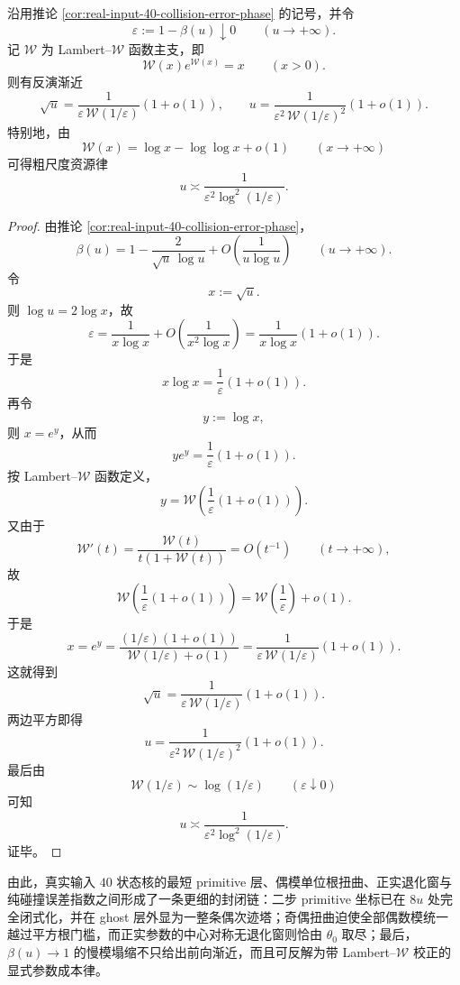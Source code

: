 \begin{theorem}\label{thm:xi-time-part68a-collision-beta-lambertw-inversion}
沿用推论 \ref{cor:real-input-40-collision-error-phase} 的记号，并令
\[
\varepsilon:=1-\beta(u)\downarrow 0
\qquad (u\to+\infty).
\]
记 \(\mathscr W\) 为 Lambert--\(\mathscr W\) 函数主支，即
\[
\mathscr W(x)e^{\mathscr W(x)}=x
\qquad (x>0).
\]
则有反演渐近
\[
\sqrt{u}
=
\frac{1}{\varepsilon\,\mathscr W(1/\varepsilon)}(1+o(1)),
\qquad
u
=
\frac{1}{\varepsilon^2\,\mathscr W(1/\varepsilon)^2}(1+o(1)).
\]
特别地，由
\[
\mathscr W(x)=\log x-\log\log x+o(1)
\qquad (x\to+\infty)
\]
可得粗尺度资源律
\[
u\asymp \frac{1}{\varepsilon^2\log^2(1/\varepsilon)}.
\]
\end{theorem}
\begin{proof}
由推论 \ref{cor:real-input-40-collision-error-phase}，
\[
\beta(u)=1-\frac{2}{\sqrt u\,\log u}+O\!\left(\frac{1}{u\log u}\right)
\qquad (u\to+\infty).
\]
令
\[
x:=\sqrt u.
\]
则 \(\log u=2\log x\)，故
\[
\varepsilon
=
\frac{1}{x\log x}+O\!\left(\frac{1}{x^2\log x}\right)
=
\frac{1}{x\log x}(1+o(1)).
\]
于是
\[
x\log x=\frac{1}{\varepsilon}(1+o(1)).
\]
再令
\[
y:=\log x,
\]
则 \(x=e^y\)，从而
\[
y e^y=\frac{1}{\varepsilon}(1+o(1)).
\]
按 Lambert--\(\mathscr W\) 函数定义，
\[
y=\mathscr W\!\left(\frac{1}{\varepsilon}(1+o(1))\right).
\]
又由于
\[
\mathscr W'(t)=\frac{\mathscr W(t)}{t(1+\mathscr W(t))}=O(t^{-1})
\qquad (t\to+\infty),
\]
故
\[
\mathscr W\!\left(\frac{1}{\varepsilon}(1+o(1))\right)
=
\mathscr W\!\left(\frac{1}{\varepsilon}\right)+o(1).
\]
于是
\[
x=e^y
=
\frac{(1/\varepsilon)(1+o(1))}{\mathscr W(1/\varepsilon)+o(1)}
=
\frac{1}{\varepsilon\,\mathscr W(1/\varepsilon)}(1+o(1)).
\]
这就得到
\[
\sqrt u=\frac{1}{\varepsilon\,\mathscr W(1/\varepsilon)}(1+o(1)).
\]
两边平方即得
\[
u=\frac{1}{\varepsilon^2\,\mathscr W(1/\varepsilon)^2}(1+o(1)).
\]
最后由
\[
\mathscr W(1/\varepsilon)\sim \log(1/\varepsilon)
\qquad (\varepsilon\downarrow 0)
\]
可知
\[
u\asymp \frac{1}{\varepsilon^2\log^2(1/\varepsilon)}.
\]
证毕。
\end{proof}

\noindent
由此，真实输入 \(40\) 状态核的最短 primitive 层、偶模单位根扭曲、正实退化窗与纯碰撞误差指数之间形成了一条更细的封闭链：二步 primitive 坐标已在 \(8u\) 处完全闭式化，并在 ghost 层外显为一整条偶次迹塔；奇偶扭曲迫使全部偶数模统一越过平方根门槛，而正实参数的中心对称无退化窗则恰由 \(\theta_0\) 取尽；最后，\(\beta(u)\to 1\) 的慢模塌缩不只给出前向渐近，而且可反解为带 Lambert--\(\mathscr W\) 校正的显式参数成本律。

\endinput
